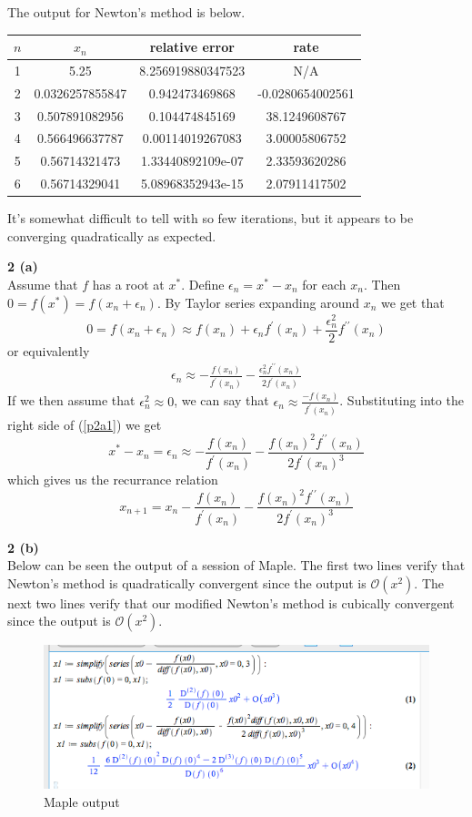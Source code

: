\documentclass[12pt]{article}
\newcommand{\problem}[1]{\hspace{-4 ex} \large \textbf{#1}\\}
\begin{document}
	The output for Newton's method is below.
	\begin{center}
	    \begin{tabular}{|c|c|c|c|}
	    	\hline
	    	$n$&$x_n$&relative error&rate\\ \hline
	    	1&5.25&8.256919880347523&N/A\\ \hline
	    	2&0.0326257855847&0.942473469868&-0.0280654002561\\ \hline
	    	3&0.507891082956&0.104474845169&38.1249608767\\ \hline
	    	4&0.566496637787&0.00114019267083&3.00005806752\\ \hline
	    	5&0.56714321473&1.33440892109e-07&2.33593620286\\ \hline
	    	6&0.56714329041&5.08968352943e-15&2.07911417502\\ \hline
	    \end{tabular}
	\end{center}
    It's somewhat difficult to tell with so few iterations, but it appears to be converging quadratically as expected.
    
\problem{2 (a)}
	Assume that $f$ has a root at $x^*$. Define $\epsilon_n = x^*-x_n$ for each $x_n$. Then $0 = f(x^*) = f(x_n + \epsilon_n)$. By Taylor series expanding around $x_n$ we get that 
	$$
	0 = f(x_n + \epsilon_n) \approx f(x_n) + \epsilon_n f^\prime(x_n) + \frac{\epsilon_n^2}{2}f^{\prime\prime}(x_n)
	$$
	or equivalently
	\begin{align}\label{p2a1}
	\epsilon_n \approx -\frac{f(x_n)}{f^\prime(x_n)} - \frac{\epsilon_n^2f^{\prime\prime}(x_n)}{2f^\prime(x_n)}
	\end{align}
	If we then assume that $\epsilon_n^2 \approx 0$, we can say that $\epsilon_n \approx \frac{-f(x_n)}{f^\prime(x_n)}$. Substituting into the right side of (\ref{p2a1}) we get 
	$$
	x^* - x_n = \epsilon_n \approx -\frac{f(x_n)}{f^\prime(x_n)} - \frac{f(x_n)^2f^{\prime\prime}(x_n)}{2f^\prime(x_n)^3}
	$$
	which gives us the recurrance relation
	$$
	x_{n+1} = x_n -\frac{f(x_n)}{f^\prime(x_n)} - \frac{f(x_n)^2f^{\prime\prime}(x_n)}{2f^\prime(x_n)^3}
	$$
	
\problem{2 (b)}
	Below can be seen the output of a session of Maple. The first two lines verify that Newton's method is quadratically convergent since the output is $\mathcal{O}(x^2)$. The next two lines verify that our modified Newton's method is cubically convergent since the output is $\mathcal{O}(x^2)$.
	
	\begin{figure}[h]
		\caption{Maple output}
		\centering
		\includegraphics[width=.75\textwidth]{hw2_p3b}
	\end{figure}
	
\end{document}
